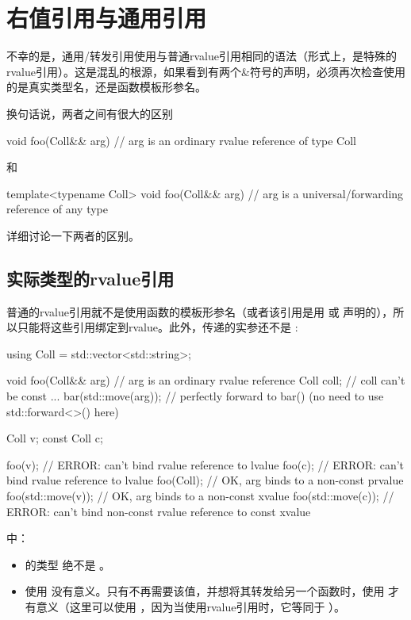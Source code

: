 \section{右值引用与通用引用}
不幸的是，通用/转发引用使用与普通rvalue引用相同的语法（形式上，是特殊的rvalue引用）。这是混乱的根源，如果看到有两个\&符号的声明，必须再次检查使用的是真实类型名，还是函数模板形参名。

换句话说，两者之间有很大的区别

\begin{cppcode}
void foo(Coll&& arg) // arg is an ordinary rvalue reference of type Coll
\end{cppcode}

和

\begin{cppcode}
template<typename Coll>
void foo(Coll&& arg) // arg is a universal/forwarding reference of any type
\end{cppcode}

详细讨论一下两者的区别。

\subsection{实际类型的rvalue引用}

普通的rvalue引用就不是使用函数的模板形参名（或者该引用是用  或  声明的），所以只能将这些引用绑定到rvalue。此外，传递的实参还不是 :

\begin{cppcode}
using Coll = std::vector<std::string>;

void foo(Coll&& arg) // arg is an ordinary rvalue reference
{
	Coll coll; // coll can’t be const
	...
	bar(std::move(arg)); // perfectly forward to bar() (no need to use std::forward<>() here)
}

Coll v;
const Coll c;

foo(v); // ERROR: can’t bind rvalue reference to lvalue
foo(c); // ERROR: can’t bind rvalue reference to lvalue
foo(Coll{}); // OK, arg binds to a non-const prvalue
foo(std::move(v)); // OK, arg binds to a non-const xvalue
foo(std::move(c)); // ERROR: can’t bind non-const rvalue reference to const xvalue
\end{cppcode}

 中：

\begin{itemize}
	\item {} 的类型  绝不是 。
	\item 使用  没有意义。只有不再需要该值，并想将其转发给另一个函数时，使用  才有意义（这里可以使用 ，因为当使用rvalue引用时，它等同于 ）。
\end{itemize}

